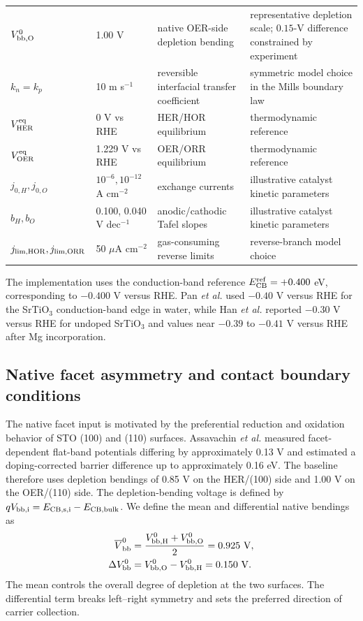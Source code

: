 \documentclass[11pt]{article}
\begin{document}
\begin{table}[p]
\begin{tabular}{@{}p{}p{}p{}p{}@{}}
$V_{\rm bb,O}^0$ & 1.00 V & native OER-side depletion bending & representative depletion scale; $0.15$-V difference constrained by experiment\cite{assavachin2024} \\
$k_n=k_p$ & 10 m s$^{-1}$ & reversible interfacial transfer coefficient & symmetric model choice in the Mills boundary law\cite{mills2014} \\
$V_{\rm HER}^{\rm eq}$ & 0 V vs RHE & HER/HOR equilibrium & thermodynamic reference \\
$V_{\rm OER}^{\rm eq}$ & 1.229 V vs RHE & OER/ORR equilibrium & thermodynamic reference \\
$j_{0,H},j_{0,O}$ & $10^{-6},10^{-12}$ A cm$^{-2}$ & exchange currents & illustrative catalyst kinetic parameters \\
$b_H,b_O$ & 0.100, 0.040 V dec$^{-1}$ & anodic/cathodic Tafel slopes & illustrative catalyst kinetic parameters \\
$j_{\rm lim,HOR},j_{\rm lim,ORR}$ & 50 $\mu$A cm$^{-2}$ & gas-consuming reverse limits & reverse-branch model choice \\
\bottomrule
\end{tabular}
\end{table}

The implementation uses the conduction-band reference $E_{\rm CB}^{\rm ref}=+0.400$ eV, corresponding to $-0.400$ V versus RHE. Pan \textit{et al.} used $-0.40$ V versus RHE for the SrTiO$_3$ conduction-band edge in water, while Han \textit{et al.} reported $-0.30$ V versus RHE for undoped SrTiO$_3$ and values near $-0.39$ to $-0.41$ V versus RHE after Mg incorporation.\cite{pan2020,han2017}

\subsection{Native facet asymmetry and contact boundary conditions}

The native facet input is motivated by the preferential reduction and oxidation behavior of STO (100) and (110) surfaces.\cite{takata2020,assavachin2024} Assavachin \textit{et al.} measured facet-dependent flat-band potentials differing by approximately 0.13 V and estimated a doping-corrected barrier difference up to approximately 0.16 eV.\cite{assavachin2024} The baseline therefore uses depletion bendings of 0.85 V on the HER/(100) side and 1.00 V on the OER/(110) side. The depletion-bending voltage is defined by $qV_{\rm bb,i}=E_{\rm CB,s,i}-E_{\rm CB,bulk}$. We define the mean and differential native bendings as
\begin{align}
\overline V_{\rm bb}^{0}&=\frac{V_{\rm bb,H}^{0}+V_{\rm bb,O}^{0}}{2}=0.925~\mathrm V,\\
\Delta V_{\rm bb}^{0}&=V_{\rm bb,O}^{0}-V_{\rm bb,H}^{0}=0.150~\mathrm V.
\label{eq:mean-differential-bending}
\end{align}
The mean controls the overall degree of depletion at the two surfaces. The differential term breaks left--right symmetry and sets the preferred direction of carrier collection.
\end{document}
